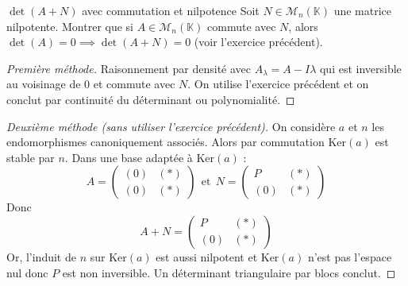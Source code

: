 \documentclass[french,a4paper]{article}
\newcommand{\K}{\mathbb{K}}
\renewcommand{\ker}{\text{Ker}}
\theoremstyle{plain}
\theoremstyle{definition}
\theoremstyle{remark}
\begin{document}
\begin{ex}{$\det(A+N)$ avec commutation et nilpotence}
	Soit $N\in\mathcal{M}_n(\K)$ une matrice nilpotente. Montrer que si $A\in\mathcal{M}_n(\K)$ commute avec $N$, alors $\det(A)=0\implies\det(A+N)=0$ (voir l'exercice précédent).
\end{ex}
\begin{proof}[Première méthode]
	Raisonnement par densité avec $A_\lambda=A-I\lambda$ qui est inversible au voisinage de $0$ et commute avec $N$. On utilise l'exercice précédent et on conclut par continuité du déterminant ou polynomialité.
\end{proof}
\begin{proof}[Deuxième méthode (sans utiliser l'exercice précédent)]
	On considère $a$ et $n$ les endomorphismes canoniquement associés. Alors par commutation $\ker(a)$ est stable par $n$. Dans une base adaptée à $\ker(a)$ : $$A=\begin{pmatrix}
		(0)&(*)\\
		(0)&(*)
	\end{pmatrix}\ \ \text{et} \ \ N=\begin{pmatrix}
		P&(*)\\
		(0)&(*)
	\end{pmatrix}$$ Donc $$A+N=\begin{pmatrix}
		P&(*)\\
		(0)&(*)
	\end{pmatrix}$$ Or, l'induit de $n$ sur $\ker(a)$ est aussi nilpotent et $\ker(a)$ n'est pas l'espace nul donc $P$ est non inversible. Un déterminant triangulaire par blocs conclut.
\end{proof}
\end{document}
